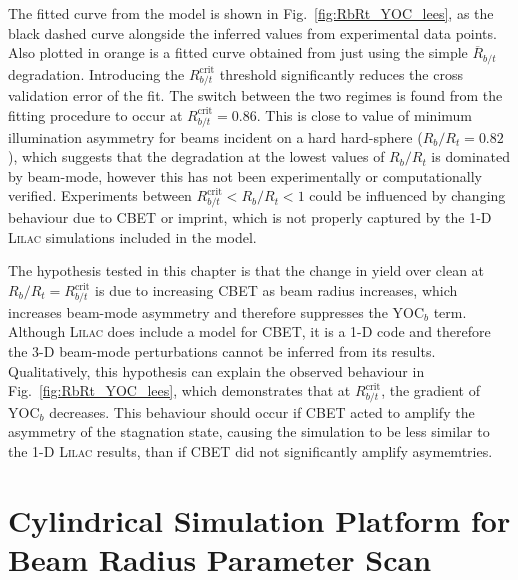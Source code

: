 The fitted curve from the model is shown in Fig.~\ref{fig:RbRt_YOC_lees}, as the black dashed curve alongside the inferred values from experimental data points.
Also plotted in orange is a fitted curve obtained from just using the simple $\overline{R}_{b/t}$ degradation.
Introducing the $R_{b/t}^{\text{crit}}$ threshold significantly reduces the cross validation error of the fit.
The switch between the two regimes is found from the fitting procedure to occur at $R_{b/t}^{\text{crit}}=0.86$.
This is close to value of minimum illumination asymmetry for beams incident on a hard hard-sphere ($R_b/R_t=0.82$), which suggests that the degradation at the lowest values of $R_b/R_t$ is dominated by beam-mode, however this has not been experimentally or computationally verified.
Experiments between $R_{b/t}^{\text{crit}} < R_b/R_t < 1$ could be influenced by changing behaviour due to \ac{CBET} or imprint, which is not properly captured by the 1-D \textsc{Lilac} simulations included in the model.

The hypothesis tested in this chapter is that the change in yield over clean at $R_b/R_t = R_{b/t}^{\text{crit}}$ is due to increasing \ac{CBET} as beam radius increases, which increases beam-mode asymmetry and therefore suppresses the $\text{YOC}_{b}$ term.
Although \textsc{Lilac} does include a model for \ac{CBET}, it is a 1-D code and therefore the 3-D beam-mode perturbations cannot be inferred from its results.
Qualitatively, this hypothesis can explain the observed behaviour in Fig.~\ref{fig:RbRt_YOC_lees}, which demonstrates that at $R_{b/t}^{\text{crit}}$, the gradient of $\text{YOC}_{b}$ decreases.
This behaviour should occur if \ac{CBET} acted to amplify the asymmetry of the stagnation state, causing the simulation to be less similar to the 1-D \textsc{Lilac} results, than if \ac{CBET} did not significantly amplify asymemtries.

\section{Cylindrical Simulation Platform for Beam Radius Parameter Scan}%
\label{sec:Res1_CylRbRt_platform}

